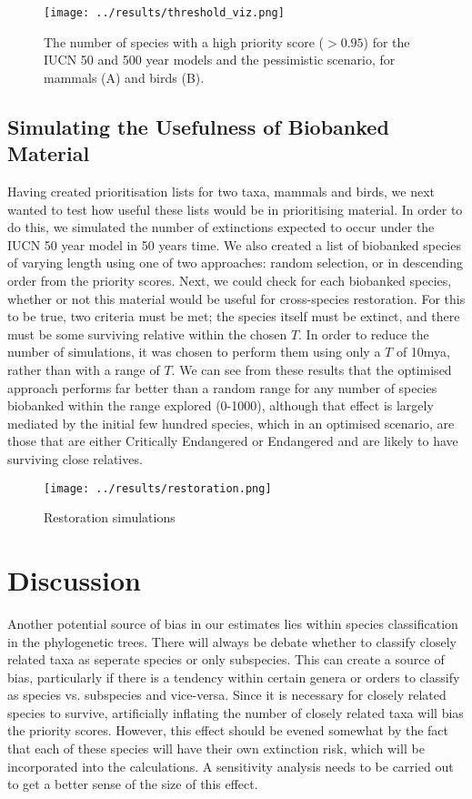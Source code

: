 \documentclass[10pt]{article}
\begin{document}
	\begin{figure}
		\texttt{[image: ../results/threshold\_viz.png]}
		\caption{The number of species with a high priority score ($> 0.95$)
			for the IUCN 50 and 500 year models and the pessimistic scenario, for 
			mammals (A) and birds (B).}\label{thresh_viz}
	\end{figure}
	
	\subsection{Simulating the Usefulness of Biobanked Material}
	Having created prioritisation lists for two taxa, mammals and birds, we next wanted to test how
	useful these lists would be in prioritising material. In order to do this, we simulated the
	number of extinctions expected to occur under the IUCN 50 year model in 50 years time. We also
	created a list of biobanked species of varying length using one of two approaches: random 
	selection, or in descending order from the priority scores. Next, we could check for each
	biobanked species, whether or not this material would be useful for cross-species restoration.
	For this to be true, two criteria must be met; the species itself must be extinct, and there
	must be some surviving relative within the chosen $T$. In order to reduce the number of
	simulations, it was chosen to perform them using only a $T$ of 10mya, rather than with a range
	of $T$.  We can see from these results that the optimised approach performs far better than a
	random range for any number of species biobanked within the range explored (0-1000), although
	that effect is largely mediated by the initial few hundred species, which in an optimised
	scenario, are those that are either Critically Endangered or Endangered and are likely to have surviving close relatives.
	
	\begin{figure}
		\texttt{[image: ../results/restoration.png]}
		\caption{Restoration simulations}\label{rest_sims}
	\end{figure}

	
	
	
	
	\section{Discussion}
	
	
	
	
	Another potential source of bias in our estimates lies within species
	classification in the phylogenetic trees. There will always be debate whether
	to classify closely related taxa as seperate species or only subspecies. This
	can create a source of bias, particularly if there is a tendency within certain
	genera or orders to classify as species vs. subspecies and vice-versa. Since it
	is necessary for closely related species to survive, artificially inflating the
	number of closely related taxa will bias the priority scores. However, this
	effect should be evened somewhat by the fact that each of these species will 
	have their own extinction risk, which will be incorporated into the
	calculations. A sensitivity analysis needs to be carried out to get a better
	sense of the size of this effect.
	
\end{document}
